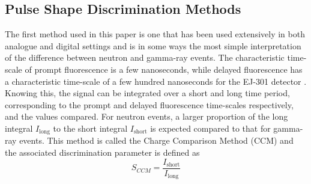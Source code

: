 \documentclass[11pt]{article}
\numberwithin{equation}{section}
\numberwithin{figure}{section}
\numberwithin{table}{section}
\begin{document}
\subsection{Pulse Shape Discrimination Methods}
\par The first method used in this paper is one that has been used extensively in both analogue and digital settings and is in some ways the most simple interpretation of the difference between neutron and gamma-ray events. The characteristic time-scale of prompt fluorescence is a few nanoseconds, while delayed fluorescence has a characteristic time-scale of a few hundred nanoseconds for the EJ-301 detector \cite{Kuchnir}. Knowing this, the signal can be integrated over a short and long time period, corresponding to the prompt and delayed fluorescence time-scales respectively, and the values compared. For neutron events, a larger proportion of the long integral $I_{\mathrm{long}}$ to the short integral $I_{\mathrm{short}}$ is expected compared to that for gamma-ray events. This method is called the Charge Comparison Method (CCM) and the associated discrimination parameter is defined as 
\begin{equation}
    S_{CCM}=\frac{I_{\mathrm{short}}}{I_{\mathrm{long}}}
    \label{eqn:CCM parameter}
\end{equation}
\end{document}

